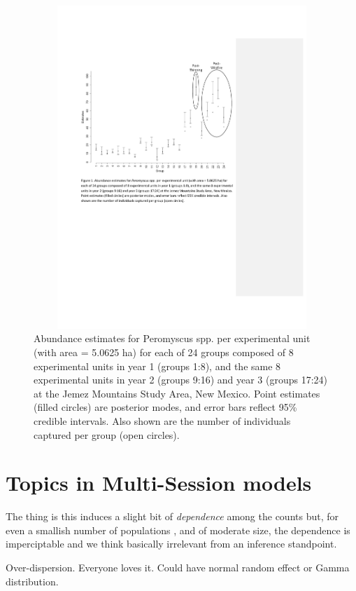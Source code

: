 \begin{figure}[htp]
\begin{center}
\includegraphics[height=4.8in,width=6.5in]{Ch14-Multisession/figs/figure_V2.pdf}
\end{center}
\caption{
Abundance estimates for Peromyscus spp. per experimental unit
(with area = 5.0625 ha) for each of 24 groups composed of 8
experimental units in year 1 (groups 1:8), and the same 8
experimental units in year 2 (groups 9:16) and year 3 (groups 17:24)
at the Jemez Mountains Study Area, New Mexico.  Point estimates
(filled circles) are posterior modes, and error bars reflect 95\%
credible intervals. Also shown are the number of individuals
captured per group (open circles).  }
\label{fig.fig1}
\end{figure}


\section{Topics in Multi-Session models}

The thing is this induces a slight bit of {\it dependence} among the
counts but, for even a smallish number of populations , and of
moderate size, the dependence is imperciptable and we think basically
irrelevant from an inference standpoint. 

Over-dispersion. Everyone loves it. Could have normal random effect or
Gamma distribution. 


